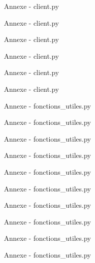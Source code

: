 \documentclass{beamer}
\begin{document}
\begin{frame}{Annexe - client.py}

\end{frame}

\begin{frame}{Annexe - client.py}

\end{frame}

\begin{frame}{Annexe - client.py}

\end{frame}

\begin{frame}{Annexe - client.py}

\end{frame}

\begin{frame}{Annexe - client.py}

\end{frame}

\begin{frame}{Annexe - client.py}

\end{frame}

\begin{frame}{Annexe - fonctions\_utiles.py}

\end{frame}

\begin{frame}{Annexe - fonctions\_utiles.py}

\end{frame}

\begin{frame}{Annexe - fonctions\_utiles.py}

\end{frame}

\begin{frame}{Annexe - fonctions\_utiles.py}

\end{frame}

\begin{frame}{Annexe - fonctions\_utiles.py}

\end{frame}

\begin{frame}{Annexe - fonctions\_utiles.py}

\end{frame}

\begin{frame}{Annexe - fonctions\_utiles.py}

\end{frame}

\begin{frame}{Annexe - fonctions\_utiles.py}

\end{frame}

\begin{frame}{Annexe - fonctions\_utiles.py}

\end{frame}

\begin{frame}{Annexe - fonctions\_utiles.py}

\end{frame}
\end{document}
